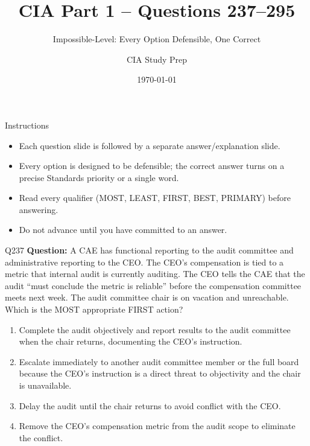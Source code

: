 \documentclass[aspectratio=169,10pt]{beamer}
\title{CIA Part 1 -- Questions 237--295}
\subtitle{Impossible-Level: Every Option Defensible, One Correct}
\author{CIA Study Prep}
\date{\today}
\begin{document}
	
	\begin{frame}
		\titlepage
	\end{frame}
	
	\begin{frame}{Instructions}
		\begin{itemize}
			\item Each question slide is followed by a separate answer/explanation slide.
			\item Every option is designed to be defensible; the correct answer turns on a precise Standards priority or a single word.
			\item Read every qualifier (MOST, LEAST, FIRST, BEST, PRIMARY) before answering.
			\item Do not advance until you have committed to an answer.
		\end{itemize}
	\end{frame}
	
	\begin{frame}[t]{Q237}
		\small
		\textbf{Question:} A CAE has functional reporting to the audit committee and administrative reporting to the CEO. The CEO's compensation is tied to a metric that internal audit is currently auditing. The CEO tells the CAE that the audit ``must conclude the metric is reliable'' before the compensation committee meets next week. The audit committee chair is on vacation and unreachable. Which is the MOST appropriate FIRST action?
		\begin{enumerate}[label=\Alph*.,itemsep=1pt,topsep=2pt]
			\item Complete the audit objectively and report results to the audit committee when the chair returns, documenting the CEO's instruction.
			\item Escalate immediately to another audit committee member or the full board because the CEO's instruction is a direct threat to objectivity and the chair is unavailable.
			\item Delay the audit until the chair returns to avoid conflict with the CEO.
			\item Remove the CEO's compensation metric from the audit scope to eliminate the conflict.
		\end{enumerate}
	\end{frame}
	
\end{document}
